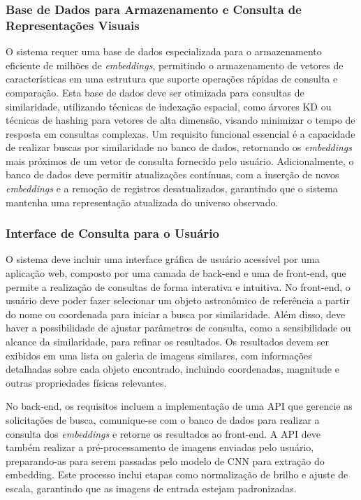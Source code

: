 \subsubsection{Base de Dados para Armazenamento e Consulta de Representações Visuais}
\label{sec:req-db}

O sistema requer uma base de dados especializada para o armazenamento eficiente de milhões de \emph{embeddings}, permitindo o armazenamento de vetores de características em uma estrutura que suporte operações rápidas de consulta e comparação. Esta base de dados deve ser otimizada para consultas de similaridade, utilizando técnicas de indexação espacial, como árvores KD ou técnicas de hashing para vetores de alta dimensão, visando minimizar o tempo de resposta em consultas complexas. Um requisito funcional essencial é a capacidade de realizar buscas por similaridade no banco de dados, retornando os \emph{embeddings} mais próximos de um vetor de consulta fornecido pelo usuário. Adicionalmente, o banco de dados deve permitir atualizações contínuas, com a inserção de novos \emph{embeddings} e a remoção de registros desatualizados, garantindo que o sistema mantenha uma representação atualizada do universo observado.






\subsubsection{Interface de Consulta para o Usuário}
\label{sec:req-webapp}

O sistema deve incluir uma interface gráfica de usuário acessível por uma aplicação web, composto por uma camada de back-end e uma de front-end, que permite a realização de consultas de forma interativa e intuitiva. No front-end, o usuário deve poder fazer  selecionar um objeto astronômico de referência a partir do nome ou coordenada para iniciar a busca por similaridade. Além disso, deve haver a possibilidade de ajustar parâmetros de consulta, como a sensibilidade ou alcance da similaridade, para refinar os resultados. Os resultados devem ser exibidos em uma lista ou galeria de imagens similares, com informações detalhadas sobre cada objeto encontrado, incluindo coordenadas, magnitude e outras propriedades físicas relevantes.

No back-end, os requisitos incluem a implementação de uma API que gerencie as solicitações de busca, comunique-se com o banco de dados para realizar a consulta dos \emph{embeddings} e retorne os resultados ao front-end. A API deve também realizar a pré-processamento de imagens enviadas pelo usuário, preparando-as para serem passadas pelo modelo de CNN para extração do embedding. Este processo inclui etapas como normalização de brilho e ajuste de escala, garantindo que as imagens de entrada estejam padronizadas.







